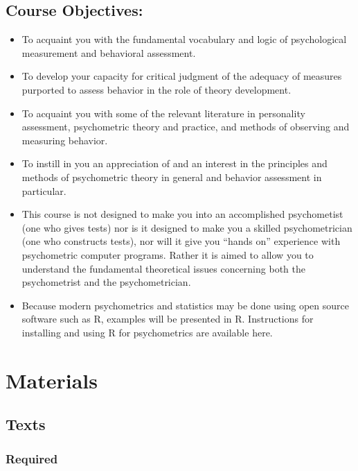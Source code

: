 \documentclass[11pt,]{article}
\providecommand{\tightlist}{%
  \setlength{\itemsep}{0pt}\setlength{\parskip}{0pt}}
\begin{document}
\hypertarget{course-objectives}{%
\subsection{Course Objectives:}\label{course-objectives}}

\begin{itemize}
\tightlist
\item
  To acquaint you with the fundamental vocabulary and logic of
  psychological measurement and behavioral assessment.
\item
  To develop your capacity for critical judgment of the adequacy of
  measures purported to assess behavior in the role of theory
  development.
\item
  To acquaint you with some of the relevant literature in personality
  assessment, psychometric theory and practice, and methods of observing
  and measuring behavior.
\item
  To instill in you an appreciation of and an interest in the principles
  and methods of psychometric theory in general and behavior assessment
  in particular.
\item
  This course is not designed to make you into an accomplished
  psychometist (one who gives tests) nor is it designed to make you a
  skilled psychometrician (one who constructs tests), nor will it give
  you ``hands on'' experience with psychometric computer programs.
  Rather it is aimed to allow you to understand the fundamental
  theoretical issues concerning both the psychometrist and the
  psychometrician.
\item
  Because modern psychometrics and statistics may be done using open
  source software such as R, examples will be presented in R.
  Instructions for installing and using R for psychometrics are
  available here.
\end{itemize}

\hypertarget{materials}{%
\section{Materials}\label{materials}}

\hypertarget{texts}{%
\subsection{Texts}\label{texts}}

\hypertarget{required}{%
\subsubsection{Required}\label{required}}
\end{document}

